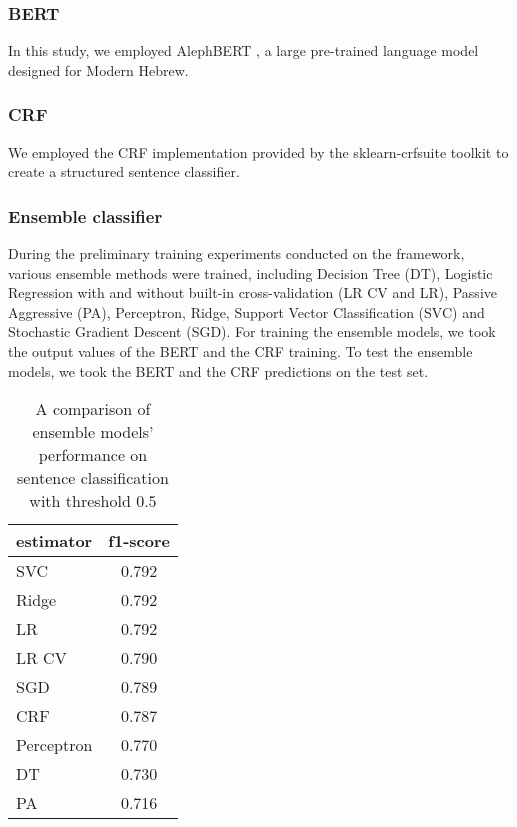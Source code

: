 \documentclass[preprint,12pt]{elsarticle}
\begin{document}
\subsubsection{BERT}
In this study, we employed AlephBERT \cite{alephBert2021}, a large pre-trained language model designed for Modern Hebrew. 

\subsubsection{CRF}
We employed the CRF implementation provided by the sklearn-crfsuite toolkit \cite{CRFsuite} to create a structured sentence classifier.

\subsubsection{Ensemble classifier}

During the preliminary training experiments conducted on the framework, various ensemble methods were trained, including Decision Tree (DT), Logistic Regression with and without built-in cross-validation (LR CV and LR), Passive Aggressive (PA), Perceptron, Ridge, Support Vector Classification (SVC) and Stochastic Gradient Descent (SGD).  For training the ensemble models, we took the output values of the BERT and the CRF training. To test the ensemble models,  we took the BERT and the CRF predictions on the test set.


\begin{table}[ht]
    \centering
     \def\arraystretch{1.5}
     \begin{tabular}{l c}
      \hline
 estimator & f1-score\\ \hline
SVC	& 0.792\\ %
Ridge	& 0.792\\ %
LR &	0.792\\%
LR CV &	0.790\\%
SGD &	0.789\\ %
CRF	& 0.787\\ %
Perceptron &	0.770\\ %
DT &	0.730\\ %
PA &	0.716\\%
\hline
\end{tabular}
\caption{A comparison of ensemble models' performance on sentence classification with threshold $0.5$}
    \label{table:all.ens.result}
\end{table}
\end{document}
